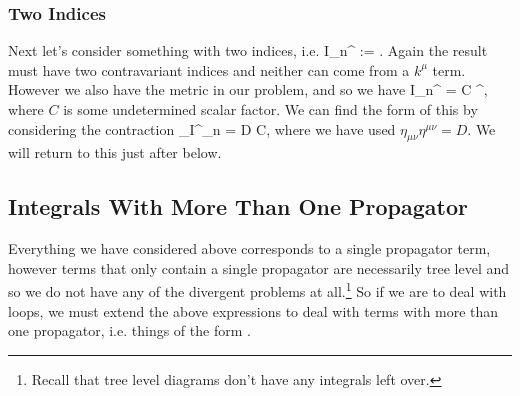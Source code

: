 \subsubsection{Two Indices}

Next let's consider something with two indices, i.e. 
\bse 
    I_n^{\mu\nu} := \int {} .
\ese 
Again the result must have two contravariant indices and neither can come from a $k^{\mu}$ term. However we also have the metric in our problem, and so we have 
\bse 
    I_n^{\mu\nu} = C \eta^{\mu\nu},
\ese 
where $C$ is some undetermined scalar factor. We can find the form of this by considering the contraction 
\bse 
    \eta_{\mu\nu}I^{\mu\nu}_n = D C,
\ese
where we have used $\eta_{\mu\nu}\eta^{\mu\nu}=D$. We will return to this just after  below.

\subsection{Integrals With More Than One Propagator}

Everything we have considered above corresponds to a single propagator term, however terms that only contain a single propagator are necessarily tree level and so we do not have any of the divergent problems at all.\footnote{Recall that tree level diagrams don't have any integrals left over.} So if we are to deal with loops, we must extend the above expressions to deal with terms with more than one propagator, i.e. things of the form
\bse 
    \int {} .
\ese 

